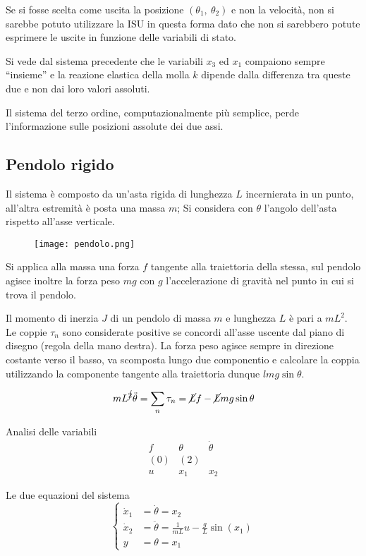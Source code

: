 Se si fosse scelta come uscita la posizione $(\theta_1,\ \theta_2)$ e non la
velocità, non si sarebbe potuto utilizzare la ISU in questa forma dato che non
si sarebbero potute esprimere le uscite in funzione delle variabili di stato.

Si vede dal sistema precedente che le variabili $x_3$ ed $x_1$ compaiono sempre
``insieme'' e la reazione elastica della molla $k$ dipende dalla differenza tra
queste due e non dai loro valori assoluti.

Il sistema del terzo ordine, computazionalmente più semplice, perde
l'informazione sulle posizioni assolute dei due assi.

\newpage
\subsection{Pendolo rigido}
\label{sec.:pendolo_rigido}
Il sistema è composto da un'asta rigida di lunghezza $L$ incernierata in un
punto, all'altra estremità è posta una massa $m$;
Si considera con $\theta$ l'angolo dell'asta rispetto all'asse verticale.
\begin{figure}[h]
 \centering
 \texttt{[image: pendolo.png]}
 \label{Fig.:pendolo_semplice}
\end{figure}

Si applica alla massa una forza $f$ tangente alla traiettoria della stessa, sul
pendolo agisce inoltre la forza peso $mg$ con $g$ l'accelerazione di gravità
nel punto in cui si trova il pendolo.

Il momento di inerzia $J$ di un pendolo di massa $m$ e lunghezza $L$ è pari a
$mL^2$.
Le coppie $\tau_n$ sono considerate positive se concordi all'asse uscente dal
piano di disegno (regola della mano destra).
La forza peso agisce sempre in direzione costante verso il basso, va scomposta
lungo due componentio e calcolare la coppia utilizzando la componente tangente
alla traiettoria dunque $lmg\sin\theta$.

$$
mL^{\cancel{2}}\ddot\theta = \sum_n{\tau_n} = \cancel{L}f -
\cancel{L}mg\sin\theta
$$

Analisi delle variabili
$$\begin{matrix}
f & \theta & \dot\theta \\
(0) & (2)  \\
u & x_1 & x_2
\end{matrix}$$

Le due equazioni del sistema
$$\left\{\begin{aligned}
\dot x_1 &= \dot\theta = x_2\\
\dot x_2 &= \ddot\theta = \frac{1}{mL} u - \frac{g}{L} \sin(x_1) \\
y &= \theta = x_1
\end{aligned}\right.$$

